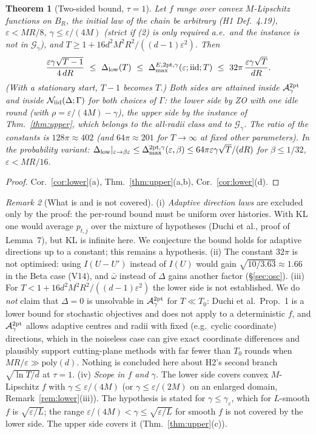 \documentclass[11pt,a4paper]{article}
\numberwithin{equation}{section}
\newtheorem{theorem}{Theorem}[section]
\theoremstyle{definition}
\theoremstyle{remark}
\newtheorem{remark}[theorem]{Remark}
\newcommand{\Dmax}{\Delta_{\max}}\newcommand{\Dcp}{\Delta_{\rm cp}}\newcommand{\Dlow}{\Delta_{\rm low}}
\newcommand{\cN}{\mathcal N}\newcommand{\cA}{\mathcal A}\newcommand{\cG}{\mathcal G}\newcommand{\cF}{\mathcal F}
\newcommand{\wbar}{\bar\omega}\newcommand{\Atwo}{\cA^{\rm 2pt}_\gamma}
\begin{document}
\begin{theorem}[Two-sided bound, $\tau=1$]\label{thm:main}
Let $f$ range over convex $M$-Lipschitz functions on $B_R$, the initial law of the chain be arbitrary (H1 Def.~4.19), $\varepsilon<MR/8$, $\gamma\le\varepsilon/(4M)$ (strict if (2) is only required a.e.\ and the instance is not in $\cG_\gamma$), and $T\ge1+16d^2M^2R^2/((d-1)\varepsilon^2)$. Then
\[
\frac{\varepsilon\gamma\sqrt{T-1}}{4\,dR}\ \le\ \Dlow(T)\ \le\ \Dmax^{E,\mathrm{2pt},\gamma}(\varepsilon;\iid;T)\ \le\ 32\pi\,\frac{\varepsilon\gamma\sqrt T}{dR}.
\]
(With a stationary start, $T-1$ becomes $T$.) Both sides are attained inside $\Atwo$ and inside $\cN_\iid(\Delta;\Gamma)$ for both choices of $\Gamma$: the lower side by ZO with one idle round (with $\rho=\varepsilon/(4M)-\gamma$), the upper side by the instance of Thm.~\ref{thm:upper}, which belongs to the all-radii class and to $\cG_\gamma$. The ratio of the constants is $128\pi\approx402$ (and $64\pi\approx201$ for $T\to\infty$ at fixed other parameters). In the probability variant: $\Dlow|_{\varepsilon\to\beta\varepsilon}\le\Dmax^{\mathrm{2pt},\gamma}(\varepsilon,\beta)\le64\pi\varepsilon\gamma\sqrt T/(dR)$ for $\beta\le1/32$, $\varepsilon<MR/16$.
\end{theorem}
\begin{proof}
Cor.~\ref{cor:lower}(a), Thm.~\ref{thm:upper}(a,b), Cor.~\ref{cor:lower}(d).
\end{proof}

\begin{remark}[What is and is not covered]\label{rem:scope}
(i) \emph{Adaptive direction laws} are excluded only by the proof: the per-round bound must be uniform over histories. With KL one would average $p_{t,j}$ over the mixture of hypotheses (Duchi et al., proof of Lemma~7), but KL is infinite here. We conjecture the bound holds for adaptive directions up to a constant; this remains a hypothesis. (ii) The constant $32\pi$ is not optimised: using $I(U-U')$ instead of $I(U)$ would gain $\sqrt{10/3.63}\approx1.66$ in the Beta case (V14), and $\wbar$ instead of $\Delta$ gains another factor (\S\ref{sec:osc}). (iii) For $T<1+16d^2M^2R^2/((d-1)\varepsilon^2)$ the lower side is not established. We do \emph{not} claim that $\Delta=0$ is unsolvable in $\Atwo$ for $T\ll T_0$: Duchi et al.\ Prop.~1 is a lower bound for stochastic objectives and does not apply to a deterministic $f$, and $\Atwo$ allows adaptive centres and radii with fixed (e.g.\ cyclic coordinate) directions, which in the noiseless case can give exact coordinate differences and plausibly support cutting-plane methods with far fewer than $T_0$ rounds when $MR/\varepsilon\gg\mathrm{poly}(d)$. Nothing is concluded here about H2's second branch $\sqrt{\ln T/d}$ at $\tau=1$. (iv) \emph{Scope in $f$ and $\gamma$.} The lower side covers convex $M$-Lipschitz $f$ with $\gamma\le\varepsilon/(4M)$ (or $\gamma\le\varepsilon/(2M)$ on an enlarged domain, Remark~\ref{rem:lower}(iii)). The hypothesis is stated for $\gamma\le\gamma_\varepsilon$, which for $L$-smooth $f$ is $\sqrt{\varepsilon/L}$; the range $\varepsilon/(4M)<\gamma\le\sqrt{\varepsilon/L}$ for smooth $f$ is not covered by the lower side. The upper side covers it (Thm.~\ref{thm:upper}(c)).
\end{remark}
\end{document}
